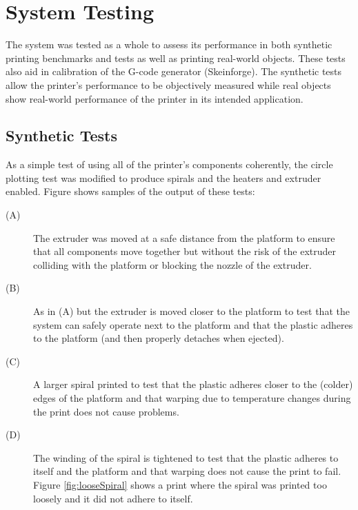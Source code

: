 	
	\section{System Testing}
		
		The system was tested as a whole to assess its performance in both synthetic
		printing benchmarks and tests as well as printing real-world objects. These
		tests also aid in calibration of the G-code generator (Skeinforge). The
		synthetic tests allow the printer's performance to be objectively measured
		while real objects show real-world performance of the printer in its
		intended application.
		
		\subsection{Synthetic Tests}
			
			As a simple test of using all of the printer's components coherently, the
			circle plotting test was modified to produce spirals and the heaters and
			extruder enabled. Figure \label{fig:syntheticTests} shows samples of the
			output of these tests:
			\begin{description}
				
				\item[(A)] The extruder was moved at a safe distance from the platform
				to ensure that all components move together but without the risk of the
				extruder colliding with the platform or blocking the nozzle of the
				extruder.
				
				\item[(B)] As in (A) but the extruder is moved closer to the platform to
				test that the system can safely operate next to the platform and that
				the plastic adheres to the platform (and then properly detaches when
				ejected).
				
				\item[(C)] A larger spiral printed to test that the plastic adheres
				closer to the (colder) edges of the platform and that warping due to
				temperature changes during the print does not cause problems.
				
				\item[(D)] The winding of the spiral is tightened to test that the
				plastic adheres to itself and the platform and that warping does not
				cause the print to fail. Figure \ref{fig:looseSpiral} shows a print
				where the spiral was printed too loosely and it did not adhere to
				itself.
				
			\end{description}
			
